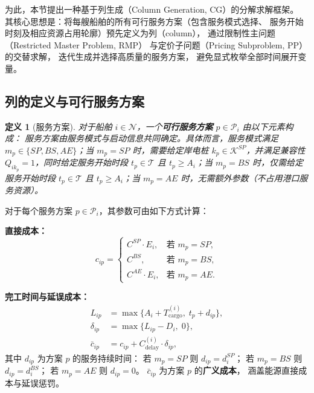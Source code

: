 \documentclass[UTF8, a4paper, 12pt]{ctexart}
\newtheorem{definition}{定义}
\begin{document}
为此，本节提出一种基于列生成（Column Generation, CG）的分解求解框架。
其核心思想是：将每艘船舶的所有可行服务方案（包含服务模式选择、
服务开始时刻及相应资源占用轮廓）预先定义为列（column），
通过限制性主问题（Restricted Master Problem, RMP）
与定价子问题（Pricing Subproblem, PP）的交替求解，
迭代生成并选择高质量的服务方案，
避免显式枚举全部时间展开变量。

\subsection{列的定义与可行服务方案}
\label{sec:cg_column}

\begin{definition}[服务方案]
对于船舶 $i \in \mathcal{N}$，一个\textbf{可行服务方案} $p \in \mathcal{P}_i$
由以下元素构成：
服务方案由服务模式与启动信息共同确定。具体而言，服务模式满足 $m_p \in \{SP, BS, AE\}$；当 $m_p = SP$ 时，需要给定岸电桩 $k_p \in \mathcal{K}^{SP}$，并满足兼容性 $Q_{ik_p} = 1$，同时给定服务开始时段 $t_p \in \mathcal{T}$ 且 $t_p \ge A_i$；当 $m_p = BS$ 时，仅需给定服务开始时段 $t_p \in \mathcal{T}$ 且 $t_p \ge A_i$；当 $m_p = AE$ 时，无需额外参数（不占用港口服务资源）。
\end{definition}

\noindent
对于每个服务方案 $p \in \mathcal{P}_i$，其参数可由如下方式计算：

\medskip
\noindent\textbf{直接成本：}
\begin{equation}
  c_{ip} =
  \begin{cases}
    C^{SP} \cdot E_i, & \text{若 } m_p = SP, \\
    C^{BS}, & \text{若 } m_p = BS, \\
    C^{AE} \cdot E_i, & \text{若 } m_p = AE.
  \end{cases}
  \label{eq:col_cost}
\end{equation}

\noindent\textbf{完工时间与延误成本：}
\begin{align}
  L_{ip} &= \max\!\Big\{A_i + T_{\text{cargo}}^{(i)},\;
    t_p + d_{ip}\Big\},
  \label{eq:col_finish} \\
  \delta_{ip} &= \max\!\big\{L_{ip} - D_i,\; 0\big\},
  \label{eq:col_delay} \\
  \bar{c}_{ip} &= c_{ip} + C_{\text{delay}}^{(i)} \cdot \delta_{ip},
  \label{eq:col_gencost}
\end{align}
其中 $d_{ip}$ 为方案 $p$ 的服务持续时间：
若 $m_p = SP$ 则 $d_{ip} = d_i^{SP}$；
若 $m_p = BS$ 则 $d_{ip} = d_i^{BS}$；
若 $m_p = AE$ 则 $d_{ip} = 0$。
$\bar{c}_{ip}$ 为方案 $p$ 的\textbf{广义成本}，
涵盖能源直接成本与延误惩罚。
\end{document}
